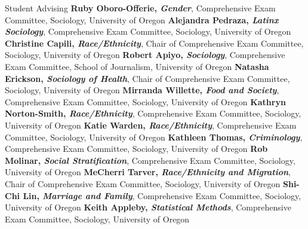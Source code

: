 \begin{rubric}{Student Advising}
\entry*[2026] \textbf{Ruby Oboro-Offerie, \emph{Gender}}, Comprehensive Exam Committee, Sociology, University of Oregon  
\entry*[2024] \textbf{Alejandra Pedraza, \emph{Latinx Sociology}}, Comprehensive Exam Committee, Sociology, University of Oregon  
\entry*[2023] \textbf{Christine Capili, \emph{Race/Ethnicity}}, Chair of Comprehensive Exam Committee, Sociology, University of Oregon  
\entry*[2022] \textbf{Robert Apiyo, \emph{Sociology}}, Comprehensive Exam Committee, School of Journalism, University of Oregon  
\entry*[2020] \textbf{Natasha Erickson, \emph{Sociology of Health}}, Chair of Comprehensive Exam Committee, Sociology, University of Oregon  
\entry*[2018] \textbf{Mirranda Willette, \emph{Food and Society}}, Comprehensive Exam Committee, Sociology, University of Oregon  
\entry*[2016] \textbf{Kathryn Norton-Smith, \emph{Race/Ethnicity}}, Comprehensive Exam Committee, Sociology, University of Oregon  
\entry*[2015] \textbf{Katie Warden, \emph{Race/Ethnicity}}, Comprehensive Exam Committee, Sociology, University of Oregon  
\entry*[2013] \textbf{Kathleen Thomas, \emph{Criminology}}, Comprehensive Exam Committee, Sociology, University of Oregon  
\entry*[2012] \textbf{Rob Molinar, \emph{Social Stratification}}, Comprehensive Exam Committee, Sociology, University of Oregon  
\entry*[2012] \textbf{MeCherri Tarver, \emph{Race/Ethnicity and Migration}}, Chair of Comprehensive Exam Committee, Sociology, University of Oregon  
\entry*[2011] \textbf{Shi-Chi Lin, \emph{Marriage and Family}}, Comprehensive Exam Committee, Sociology, University of Oregon  
\entry*[2008] \textbf{Keith Appleby, \emph{Statistical Methods}}, Comprehensive Exam Committee, Sociology, University of Oregon  



\end{rubric}
